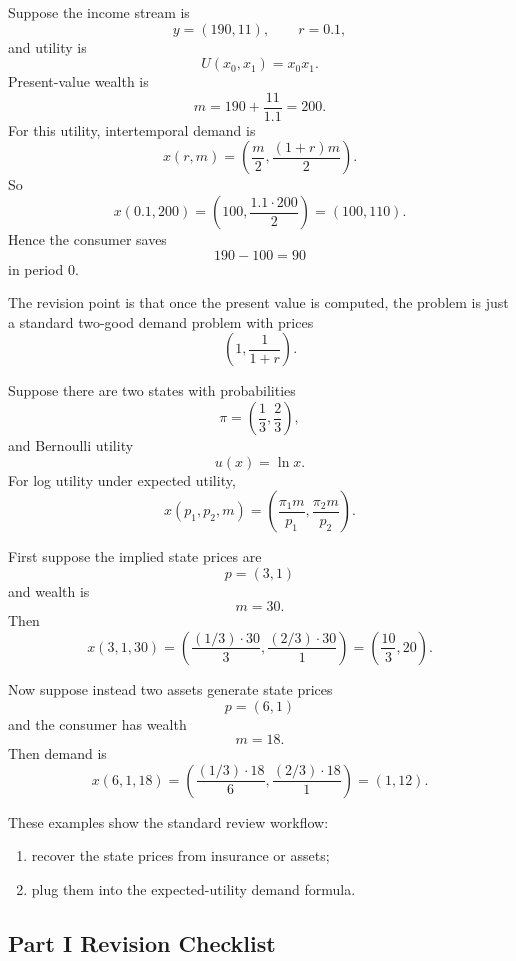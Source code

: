 \begin{examplebox}[title={Worked Review Example 4: intertemporal demand and discounting}]
Suppose the income stream is
\[
y=(190,11),
\qquad
r=0.1,
\]
and utility is
\[
U(x_0,x_1)=x_0x_1.
\]
Present-value wealth is
\[
m = 190 + \frac{11}{1.1}=200.
\]
For this utility, intertemporal demand is
\[
x(r,m)=\left(\frac{m}{2},\frac{(1+r)m}{2}\right).
\]
So
\[
x(0.1,200)=\left(100,\frac{1.1\cdot 200}{2}\right)=(100,110).
\]
Hence the consumer saves
\[
190-100=90
\]
in period 0.

The revision point is that once the present value is computed, the problem is just a standard two-good demand problem with prices
\[
\left(1,\frac{1}{1+r}\right).
\]
\end{examplebox}

\begin{examplebox}[title={Worked Review Example 5: state prices and expected-utility demand}]
Suppose there are two states with probabilities
\[
\pi=\left(\frac13,\frac23\right),
\]
and Bernoulli utility
\[
u(x)=\ln x.
\]
For log utility under expected utility,
\[
x(p_1,p_2,m)=\left(\frac{\pi_1 m}{p_1},\frac{\pi_2 m}{p_2}\right).
\]

First suppose the implied state prices are
\[
p=(3,1)
\]
and wealth is
\[
m=30.
\]
Then
\[
x(3,1,30)=\left(\frac{(1/3)\cdot 30}{3},\frac{(2/3)\cdot 30}{1}\right)=\left(\frac{10}{3},20\right).
\]

Now suppose instead two assets generate state prices
\[
p=(6,1)
\]
and the consumer has wealth
\[
m=18.
\]
Then demand is
\[
x(6,1,18)=\left(\frac{(1/3)\cdot 18}{6},\frac{(2/3)\cdot 18}{1}\right)=(1,12).
\]

These examples show the standard review workflow:
\begin{enumerate}
    \item recover the state prices from insurance or assets;
    \item plug them into the expected-utility demand formula.
\end{enumerate}
\end{examplebox}

\subsection{Part I Revision Checklist}

